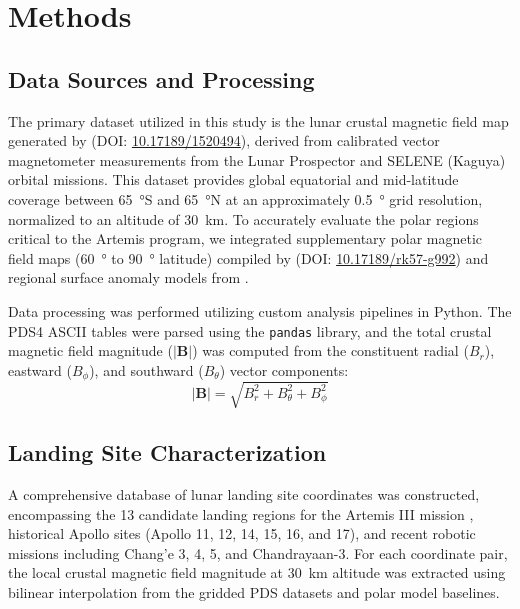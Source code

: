 \section{Methods}
\label{sec:methods}

\subsection{Data Sources and Processing}
The primary dataset utilized in this study is the lunar crustal magnetic field map generated by \citet{Hood2020} (DOI: \href{https://doi.org/10.17189/1520494}{10.17189/1520494}), derived from calibrated vector magnetometer measurements from the Lunar Prospector and SELENE (Kaguya) orbital missions. This dataset provides global equatorial and mid-latitude coverage between \SI{65}{\degree}S and \SI{65}{\degree}N at an approximately \SI{0.5}{\degree} grid resolution, normalized to an altitude of \SI{30}{\kilo\meter}. To accurately evaluate the polar regions critical to the Artemis program, we integrated supplementary polar magnetic field maps (\SI{60}{\degree} to \SI{90}{\degree} latitude) compiled by \citet{Hood2022} (DOI: \href{https://doi.org/10.17189/rk57-g992}{10.17189/rk57-g992}) and regional surface anomaly models from \citet{Tsunakawa2015}.

Data processing was performed utilizing custom analysis pipelines in Python. The PDS4 ASCII tables were parsed using the \texttt{pandas} library, and the total crustal magnetic field magnitude ($|\mathbf{B}|$) was computed from the constituent radial ($B_r$), eastward ($B_\phi$), and southward ($B_\theta$) vector components:
\begin{equation}
|\mathbf{B}| = \sqrt{B_r^2 + B_\theta^2 + B_\phi^2}
\end{equation}

\subsection{Landing Site Characterization}
A comprehensive database of lunar landing site coordinates was constructed, encompassing the 13 candidate landing regions for the Artemis III mission \citep{NASA2022}, historical Apollo sites (Apollo 11, 12, 14, 15, 16, and 17), and recent robotic missions including Chang'e 3, 4, 5, and Chandrayaan-3. For each coordinate pair, the local crustal magnetic field magnitude at \SI{30}{\kilo\meter} altitude was extracted using bilinear interpolation from the gridded PDS datasets and polar model baselines.

